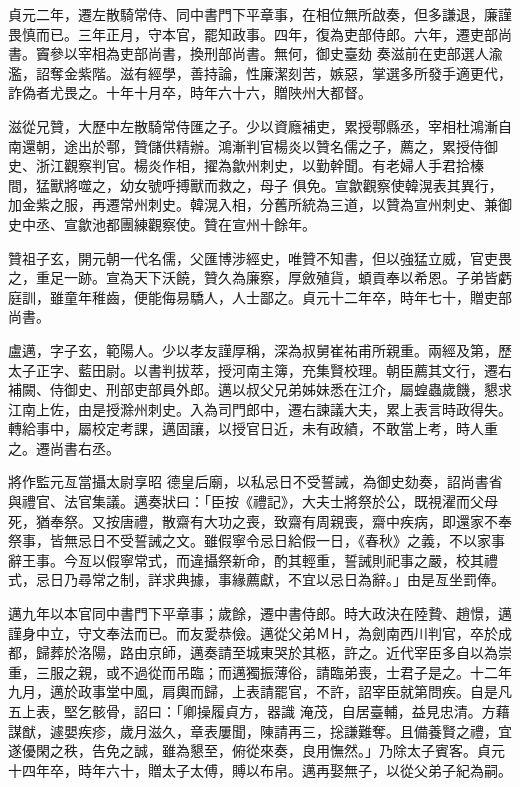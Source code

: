\begin{pinyinscope}
 貞元二年，遷左散騎常侍、同中書門下平章事，在相位無所啟奏，但多謙退，廉謹畏慎而已。三年正月，守本官，罷知政事。四年，復為吏部侍郎。六年，遷吏部尚書。竇參以宰相為吏部尚書，換刑部尚書。無何，御史臺劾
 奏滋前在吏部選人渝濫，詔奪金紫階。滋有經學，善持論，性廉潔刻苦，嫉惡，掌選多所發手適更代，詐偽者尤畏之。十年十月卒，時年六十六，贈陜州大都督。



 滋從兄贊，大歷中左散騎常侍匯之子。少以資廕補吏，累授鄠縣丞，宰相杜鴻漸自南還朝，途出於鄠，贊儲供精辦。鴻漸判官楊炎以贊名儒之子，薦之，累授侍御史、浙江觀察判官。楊炎作相，擢為歙州刺史，以勤幹聞。有老婦人手君拾榛間，猛獸將噬之，幼女號呼搏獸而救之，母子
 俱免。宣歙觀察使韓滉表其異行，加金紫之服，再遷常州刺史。韓滉入相，分舊所統為三道，以贊為宣州刺史、兼御史中丞、宣歙池都團練觀察使。贊在宣州十餘年。



 贊祖子玄，開元朝一代名儒，父匯博涉經史，唯贊不知書，但以強猛立威，官吏畏之，重足一跡。宣為天下沃饒，贊久為廉察，厚斂殖貨，蝢貢奉以希恩。子弟皆虧庭訓，雖童年稚齒，便能侮易驕人，人士鄙之。貞元十二年卒，時年七十，贈吏部尚書。



 盧邁，字子玄，範陽人。少以孝友謹厚稱，深為叔舅崔祐甫所親重。兩經及第，歷太子正字、藍田尉。以書判拔萃，授河南主簿，充集賢校理。朝臣薦其文行，遷右補闕、侍御史、刑部吏部員外郎。邁以叔父兄弟姊妹悉在江介，屬蝗蟲歲饑，懇求江南上佐，由是授滁州刺史。入為司門郎中，遷右諫議大夫，累上表言時政得失。轉給事中，屬校定考課，邁固讓，以授官日近，未有政績，不敢當上考，時人重之。遷尚書右丞。



 將作監元亙當攝太尉享昭
 德皇后廟，以私忌日不受誓誡，為御史劾奏，詔尚書省與禮官、法官集議。邁奏狀曰：「臣按《禮記》，大夫士將祭於公，既視濯而父母死，猶奉祭。又按唐禮，散齋有大功之喪，致齋有周親喪，齋中疾病，即還家不奉祭事，皆無忌日不受誓誡之文。雖假寧令忌日給假一日，《春秋》之義，不以家事辭王事。今亙以假寧常式，而違攝祭新命，酌其輕重，誓誡則祀事之嚴，校其禮式，忌日乃尋常之制，詳求典據，事緣薦獻，不宜以忌日為辭。」由是亙坐罰俸。



 邁九年以本官同中書門下平章事；歲餘，遷中書侍郎。時大政決在陸贄、趙憬，邁謹身中立，守文奉法而已。而友愛恭儉。邁從父弟ＭＨ，為劍南西川判官，卒於成都，歸葬於洛陽，路由京師，邁奏請至城東哭於其柩，許之。近代宰臣多自以為崇重，三服之親，或不過從而吊臨；而邁獨振薄俗，請臨弟喪，士君子是之。十二年九月，邁於政事堂中風，肩輿而歸，上表請罷官，不許，詔宰臣就第問疾。自是凡五上表，堅乞骸骨，詔曰：「卿操履貞方，器識
 淹茂，自居臺輔，益見忠清。方藉謀猷，遽嬰疾疹，歲月滋久，章表屢聞，陳請再三，捴謙難奪。且備養賢之禮，宜遂優閑之秩，告免之誠，雖為懇至，俯從來奏，良用憮然。」乃除太子賓客。貞元十四年卒，時年六十，贈太子太傅，賻以布帛。邁再娶無子，以從父弟子紀為嗣。




\end{pinyinscope}
